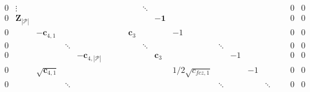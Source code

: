 \documentclass[a4paper,10pt]{article}
\begin{document}
\begin{landscape}
\begin{equation}
\begin{array}{ccccccccccccccccccccc}
0 &      \vdots                    &                            &          &                                           &                           &            &                                          &               &\ddots  &                &                     &        &                                 &    &         &    &            & 0  & 0 &   \\
0 &   \mathbf{Z}_{|\mathcal{P}|}   &                            &          &                                           &                           &            &                                          &               &        & -\mathbf{1}    &                     &        &                                 &    &         &    &            & 0  & 0 &   \\
0 &                                & -\mathbf{c}_{4,1}          &          &                                           &                           &            &                                          & \mathbf{c}_3  &        &                & -1                  &        &                                 &    &         &    &            & 0  & 0 &   \\
0 &                                &                            & \ddots   &                                           &                           &            &                                          &               & \ddots &                &                     & \ddots &                                 &    &         &    &            & 0  & 0 &   \\
0 &                                &                            &          & -\mathbf{c}_{4,|\mathcal{P}|}             &                           &            &                                          &               &        & \mathbf{c}_3   &                     &        & -1                              &    &         &    &            & 0  & 0 &   \\
0 &                                &  \sqrt{\mathbf{c}_{4,1}}   &          &                                           &                           &            &                                          &               &        &                & 1/2\sqrt{c_{fcz,1}} &        &                                 & -1 &         &    &            & 0  & 0 &   \\
0 &                                &                            & \ddots   &                                           &                           &            &                                          &               &        &                &                     & \ddots &                                 &    &  \ddots &    &            & 0  & 0 &   \\

\end{array}
\end{equation}
\end{landscape}
\end{document}
